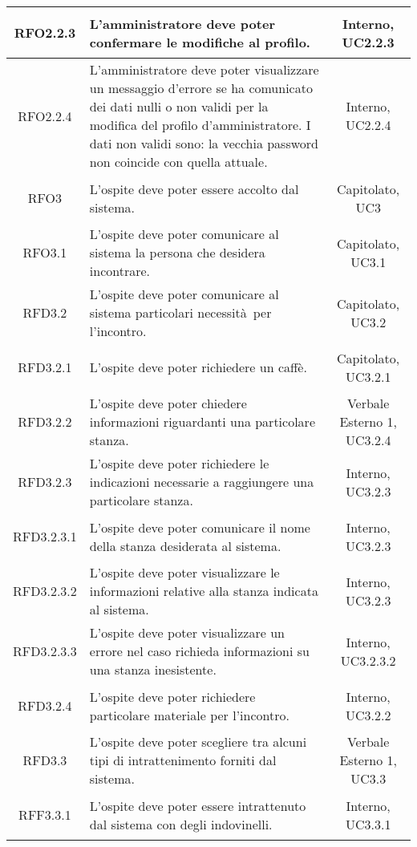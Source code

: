 \begin{longtable}{|c|>{\centering}m{7cm}|c|}
\hypertarget{RFO2.2.3}{RFO2.2.3} & L'amministratore deve poter confermare le modifiche al profilo. & Interno, UC2.2.3\\ \hline
\hypertarget{RFO2.2.4}{RFO2.2.4} & L'amministratore deve poter visualizzare un messaggio d'errore se ha comunicato dei dati nulli o non validi per la modifica del profilo d'amministratore.
 I dati non validi sono: la vecchia password non coincide con quella attuale. & Interno, UC2.2.4\\ \hline
\hypertarget{RFO3}{RFO3} & L'ospite deve poter essere accolto dal sistema. & Capitolato, UC3\\ \hline
\hypertarget{RFO3.1}{RFO3.1} & L'ospite deve poter comunicare al sistema la persona che desidera incontrare. & Capitolato, UC3.1\\ \hline
\hypertarget{RFD3.2}{RFD3.2} & L'ospite deve poter comunicare al sistema particolari necessità per l'incontro. & Capitolato, UC3.2\\ \hline
\hypertarget{RFD3.2.1}{RFD3.2.1} & L'ospite deve poter richiedere un caffè. & Capitolato, UC3.2.1\\ \hline
\hypertarget{RFD3.2.2}{RFD3.2.2} & L'ospite deve poter chiedere informazioni riguardanti una particolare stanza. & Verbale Esterno 1, UC3.2.4\\ \hline
\hypertarget{RFD3.2.3}{RFD3.2.3} & L'ospite deve poter richiedere le indicazioni necessarie a raggiungere una particolare stanza. & Interno, UC3.2.3\\ \hline
\hypertarget{RFD3.2.3.1}{RFD3.2.3.1} & L'ospite deve poter comunicare il nome della stanza desiderata al sistema. & Interno, UC3.2.3\\ \hline
\hypertarget{RFD3.2.3.2}{RFD3.2.3.2} & L'ospite deve poter visualizzare le informazioni relative alla stanza indicata al sistema. & Interno, UC3.2.3\\ \hline
\hypertarget{RFD3.2.3.3}{RFD3.2.3.3} & L'ospite deve poter visualizzare un errore nel caso richieda informazioni su una stanza inesistente. & Interno, UC3.2.3.2\\ \hline
\hypertarget{RFD3.2.4}{RFD3.2.4} & L'ospite deve poter richiedere particolare materiale per l'incontro. & Interno, UC3.2.2\\ \hline
\hypertarget{RFD3.3}{RFD3.3} & L'ospite deve poter scegliere tra alcuni tipi di intrattenimento forniti dal sistema. & Verbale Esterno 1, UC3.3\\ \hline
\hypertarget{RFF3.3.1}{RFF3.3.1} & L'ospite deve poter essere intrattenuto dal sistema con degli indovinelli. & Interno, UC3.3.1\\ \hline

\end{longtable}
